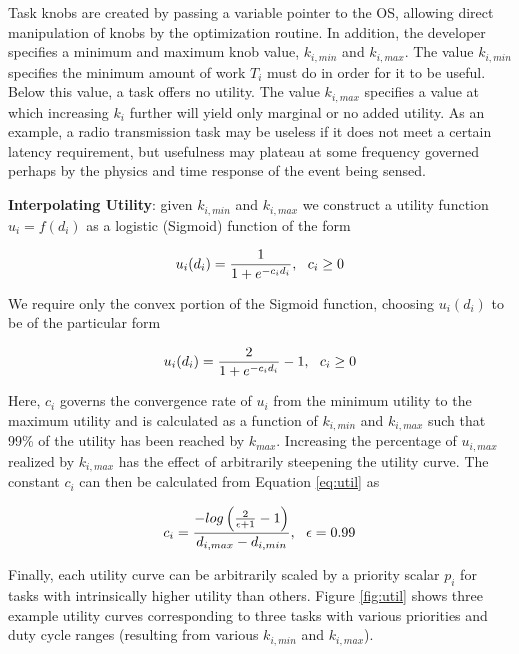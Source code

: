 Task knobs are created by passing a variable pointer to the OS, allowing direct manipulation of knobs by the optimization routine.  In addition, the developer specifies a minimum and maximum knob value, $k_{i,min}$ and $k_{i,max}$. The value $k_{i,min}$ specifies the minimum amount of work $T_i$ must do in order for it to be useful. Below this value, a task offers no utility.  The value $k_{i,max}$ specifies a value at which increasing $k_i$ further will yield only marginal or no added utility.  As an example, a radio transmission task may be useless if it does not meet a certain latency requirement, but usefulness may plateau at some frequency governed perhaps by the physics and time response of the event being sensed. 

\noindent\textbf{Interpolating Utility}: given $k_{i,min}$ and $k_{i,max}$ we construct a utility function $u_i = f(d_i)$ as a logistic (Sigmoid) function of the form 

$$
u_i(d_i) = {1\over{1 + e^{-c_id_i}}}, ~~c_i \ge 0
$$

We require only the convex portion of the Sigmoid function, choosing $u_i(d_i)$ to be of the particular form

\begin{equation}
u_i(d_i) = { 2\over { 1 + e^{-c_id_i }} }- 1, ~~c_i \ge 0
\label{eq:util}
\end{equation}

Here, $c_i$ governs the convergence rate of $u_i$ from the minimum utility to the maximum utility and is calculated as a function of $k_{i,min}$ and $k_{i,max}$ such that 99\% of the utility has been reached by $k_{max}$.  Increasing the percentage of $u_{i,max}$ realized by $k_{i,max}$ has the effect of arbitrarily steepening the utility curve. The constant $c_i$ can then be calculated from Equation \ref{eq:util} as

\begin{equation}
c_i = { -log\left( {2\over \epsilon + 1} - 1 \right) \over d_{i,max} - d_{i,min} }, ~~\epsilon = 0.99
\label{eq:c}
\end{equation}

Finally, each utility curve can be arbitrarily scaled by a priority scalar $p_i$ for tasks with intrinsically higher utility than others. Figure \ref{fig:util} shows three example utility curves corresponding to three tasks with various priorities and duty cycle ranges (resulting from various $k_{i,min}$ and $k_{i,max}$). 

